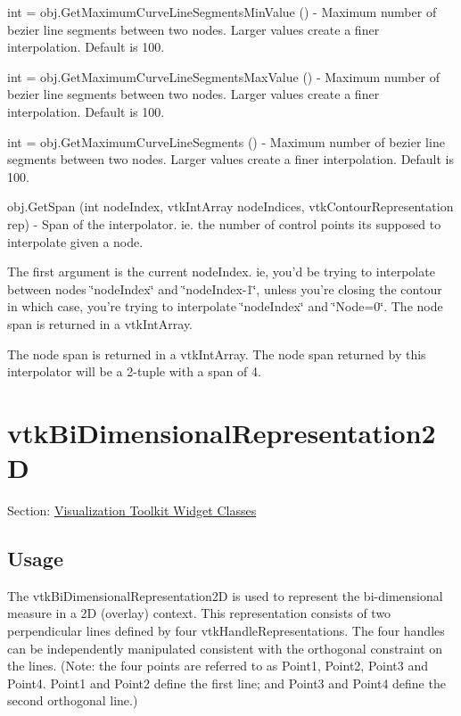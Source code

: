 \begin{DoxyItemize}
\item {\ttfamily int = obj.\-Get\-Maximum\-Curve\-Line\-Segments\-Min\-Value ()} -\/ Maximum number of bezier line segments between two nodes. Larger values create a finer interpolation. Default is 100.  
\item {\ttfamily int = obj.\-Get\-Maximum\-Curve\-Line\-Segments\-Max\-Value ()} -\/ Maximum number of bezier line segments between two nodes. Larger values create a finer interpolation. Default is 100.  
\item {\ttfamily int = obj.\-Get\-Maximum\-Curve\-Line\-Segments ()} -\/ Maximum number of bezier line segments between two nodes. Larger values create a finer interpolation. Default is 100.  
\item {\ttfamily obj.\-Get\-Span (int node\-Index, vtk\-Int\-Array node\-Indices, vtk\-Contour\-Representation rep)} -\/ Span of the interpolator. ie. the number of control points its supposed to interpolate given a node.

The first argument is the current node\-Index. ie, you'd be trying to interpolate between nodes \char`\"{}node\-Index\char`\"{} and \char`\"{}node\-Index-\/1\char`\"{}, unless you're closing the contour in which case, you're trying to interpolate \char`\"{}node\-Index\char`\"{} and \char`\"{}\-Node=0\char`\"{}. The node span is returned in a vtk\-Int\-Array.

The node span is returned in a vtk\-Int\-Array. The node span returned by this interpolator will be a 2-\/tuple with a span of 4.  
\end{DoxyItemize}\hypertarget{vtkwidgets_vtkbidimensionalrepresentation2d}{}\section{vtk\-Bi\-Dimensional\-Representation2\-D}\label{vtkwidgets_vtkbidimensionalrepresentation2d}
Section\-: \hyperlink{sec_vtkwidgets}{Visualization Toolkit Widget Classes} \hypertarget{vtkwidgets_vtkxyplotwidget_Usage}{}\subsection{Usage}\label{vtkwidgets_vtkxyplotwidget_Usage}
The vtk\-Bi\-Dimensional\-Representation2\-D is used to represent the bi-\/dimensional measure in a 2\-D (overlay) context. This representation consists of two perpendicular lines defined by four vtk\-Handle\-Representations. The four handles can be independently manipulated consistent with the orthogonal constraint on the lines. (Note\-: the four points are referred to as Point1, Point2, Point3 and Point4. Point1 and Point2 define the first line; and Point3 and Point4 define the second orthogonal line.)


